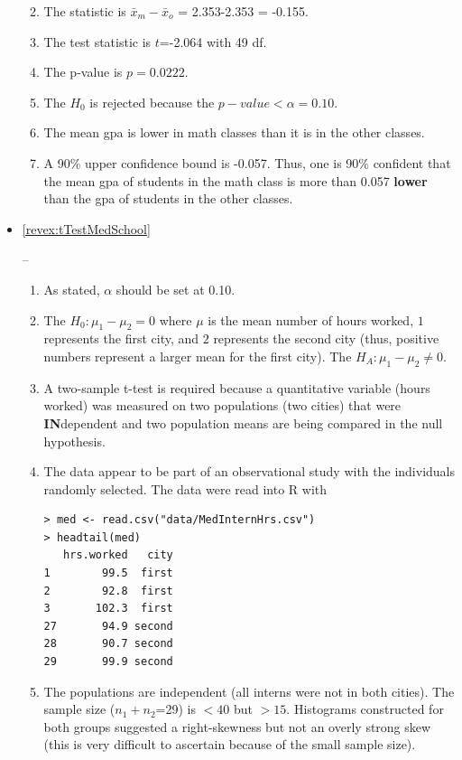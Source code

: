 \documentclass[10pt,openany]{book}\usepackage[]{graphicx}\usepackage[]{color}
\makeatletter
\newenvironment{kframe}{%
 \def\at@end@of@kframe{}%
 \ifinner\ifhmode%
  \def\at@end@of@kframe{\end{minipage}}%
  \begin{minipage}{\columnwidth}%
 \fi\fi%
 \def\FrameCommand##1{\hskip\@totalleftmargin \hskip-\fboxsep
 \colorbox{shadecolor}{##1}\hskip-\fboxsep
     \hskip-\linewidth \hskip-\@totalleftmargin \hskip\columnwidth}%
 \MakeFramed {\advance\hsize-\width
   \@totalleftmargin\z@ \linewidth\hsize
   \@setminipage}}%
 {\par\unskip\endMakeFramed%
 \at@end@of@kframe}
\newenvironment{knitrout}{}{} %
\makeatother
\begin{document}
\begin{itemize}
\begin{enumerate}
\begin{knitrout}
\end{knitrout}
      \item The statistic is $\bar{x}_{m}-\bar{x}_{o}$ = 2.353-2.353 = -0.155.
      \item The test statistic is $t$=-2.064 with 49 df.
      \item The p-value is $p=0.0222$.
      \item The $H_{0}$ is rejected because the $p-value <\alpha=0.10$.
      \item The mean gpa is lower in math classes than it is in the other classes.
      \item A 90\% upper confidence bound is -0.057.  Thus, one is 90\% confident that the mean gpa of students in the math class is more than 0.057 \textbf{lower} than the gpa of students in the other classes.
    \end{enumerate}
  \item \hypertarget{ans:tTestMedSchool}{\ref{revex:tTestMedSchool}} --
    \begin{enumerate}
      \item As stated, $\alpha$ should be set at 0.10.
      \item The $H_{0}:\mu_{1}-\mu_{2}=0$ where $\mu$ is the mean number of hours worked, $1$ represents the first city, and $2$ represents the second city (thus, positive numbers represent a larger mean for the first city).  The $H_{A}:\mu_{1}-\mu_{2}\neq0$.
      \item A two-sample t-test is required because a quantitative variable (hours worked) was measured on two populations (two cities) that were \textbf{IN}dependent and two population means are being compared in the null hypothesis.
      \item The data appear to be part of an observational study with the individuals randomly selected.  The data were read into R with
\begin{knitrout}
\color{fgcolor}\begin{kframe}
\begin{verbatim}
> med <- read.csv("data/MedInternHrs.csv")
> headtail(med)
   hrs.worked   city
1        99.5  first
2        92.8  first
3       102.3  first
27       94.9 second
28       90.7 second
29       99.9 second
\end{verbatim}
\end{kframe}
\end{knitrout}
      \item The populations are independent (all interns were not in both cities).  The sample size ($n_{1}+n_{2}$=29) is $<40$ but $>15$.  Histograms constructed for both groups  suggested a right-skewness but not an overly strong skew (this is very difficult to ascertain because of the small sample size).

\end{enumerate}
\end{itemize}
\end{document}
